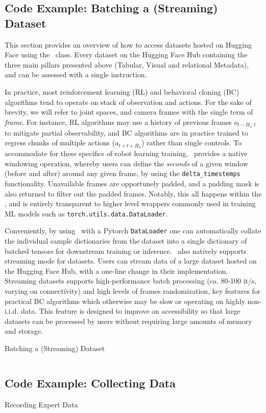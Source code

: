 \subsection{Code Example: Batching a (Streaming) Dataset}

This section provides an overview of how to access datasets hosted on Hugging Face using the \lerobotdataset~class.
Every dataset on the Hugging Face Hub containing the three main pillars presented above (Tabular, Visual and relational Metadata), and can be assessed with a single instruction.

In practice, most reinforcement learning (RL) and behavioral cloning (BC) algorithms tend to operate on stack of observation and actions.
For the sake of brevity, we will refer to joint spaces, and camera frames with the single term of \emph{frame}.
For instance, RL algorithms may use a history of previous frames \(o_{t-H_o:t} \) to mitigate partial observability, and BC algorithms are in practice trained to regress chunks of multiple actions (\(a_{t+t+H_a} \)) rather than single controls.
To accommodate for these specifics of robot learning training, \lerobotdataset~provides a native windowing operation, whereby users can define the \emph{seconds} of a given window (before and after) around any given frame, by using the \texttt{delta\_timestemps} functionality.
Unavailable frames are opportunely padded, and a padding mask is also returned to filter out the padded frames.
Notably, this all happens within the \lerobotdataset, and is entirely transparent to higher level wrappers commonly used in training ML models such as \texttt{torch.utils.data.DataLoader}.

Conveniently, by using \lerobotdataset~with a Pytorch \texttt{DataLoader} one can automatically collate the individual sample dictionaries from the dataset into a single dictionary of batched tensors for downstream training or inference.
\lerobotdataset~also natively supports streaming mode for datasets.
Users can stream data of a large dataset hosted on the Hugging Face Hub, with a one-line change in their implementation.
Streaming datasets supports high-performance batch processing (ca. 80-100 it/s, varying on connectivity) and high levels of frames randomization, key features for practical BC algorithms which otherwise may be slow or operating on highly non-i.i.d. data.
This feature is designed to improve on accessibility so that large datasets can be processed by users without requiring large amounts of memory and storage.

\begin{pbox}[label={ex:dataset-batching}]{Batching a (Streaming) Dataset 
}
\inputminted{python}{snippets/ch1/01_datasets.py}
\end{pbox}

\subsection{Code Example: Collecting Data}
\label{paragraph:collecting-data}

\begin{pbox}[label={ex:record_data}]{Recording Expert Data}
\inputminted{python}{snippets/ch1/02_record_data.py}
\end{pbox}
